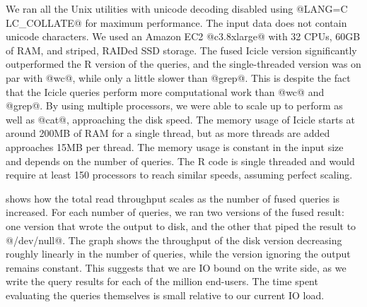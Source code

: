 We ran all the Unix utilities with unicode decoding disabled using @LANG=C LC_COLLATE@ for maximum performance. The input data does not contain unicode characters. 
We used an Amazon EC2 @c3.8xlarge@ with 32 CPUs, 60GB of RAM, and striped, RAIDed SSD storage. The fused Icicle version significantly outperformed the R version of the queries, and the single-threaded version was on par with @wc@, while only a little slower than @grep@. This is despite the fact that the Icicle queries perform more computational work than @wc@ and @grep@. By using multiple processors, we were able to scale up to perform as well as @cat@, approaching the disk speed.
The memory usage of Icicle starts at around 200MB of RAM for a single thread, but as more threads are added approaches 15MB per thread.
The memory usage is constant in the input size and depends on the number of queries.
The R code is single threaded and would require at least 150 processors to reach similar speeds, assuming perfect scaling.









 shows how the total read throughput scales as the number of fused queries is increased.
For each number of queries, we ran two versions of the fused result: one version that wrote the output to disk, and the other that piped the result to @/dev/null@.
The graph shows the throughput of the disk version decreasing roughly linearly in the number of queries, while the version ignoring the output remains constant.
This suggests that we are IO bound on the write side, as we write the query results for each of the million end-users.
The time spent evaluating the queries themselves is small relative to our current IO load.


